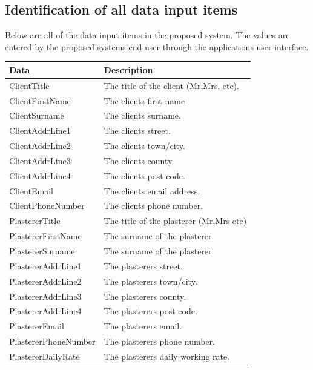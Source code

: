 \subsection{Identification of all data input items}

\begin{flushleft}
Below are all of the data input items in the proposed system. The values are entered by the proposed systems end user through 
the applications user interface.

\end{flushleft}


\begin{flushleft}

\begin{longtable}{|p{3.5cm}|p{5cm}|} \hline
\textbf{Data} & \textbf{Description} \\ \hline
ClientTitle & The title of the client (Mr,Mrs, etc). \\ \hline
ClientFirstName & The clients first name \\ \hline
ClientSurname & The clients surname. \\ \hline
ClientAddrLine1 & The clients street. \\ \hline
ClientAddrLine2 & The clients town/city. \\ \hline
ClientAddrLine3 & The clients county. \\ \hline
ClientAddrLine4 & The clients post code. \\ \hline
ClientEmail & The clients email address. \\ \hline
ClientPhoneNumber & The clients phone number. \\ \hline \hline

PlastererTitle & The title of the plasterer (Mr,Mrs etc) \\ \hline
PlastererFirstName & The surname of the plasterer. \\ \hline
PlastererSurname & The surname of the plasterer. \\ \hline
PlastererAddrLine1 & The plasterers street. \\ \hline
PlastererAddrLine2 & The plasterers town/city. \\ \hline
PlastererAddrLine3 & The plasterers county. \\ \hline
PlastererAddrLine4 & The plasterers post code. \\ \hline
PlastererEmail & The plasterers email. \\ \hline
PlastererPhoneNumber & The plasterers phone number. \\ \hline
PlastererDailyRate & The plasterers daily working rate. \\ \hline \hline



\end{longtable}
\end{flushleft}
